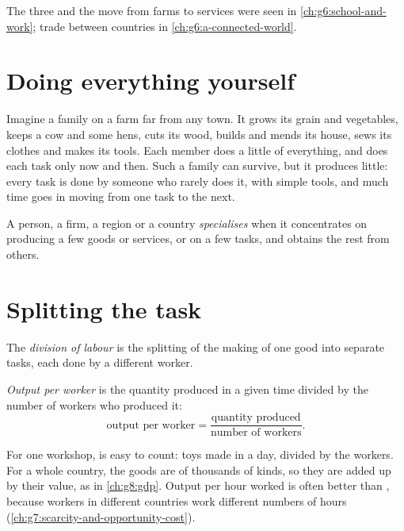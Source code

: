 \begin{recall}
The three  and the move from farms to services were seen in
\cref{ch:g6:school-and-work}; trade between countries in
\cref{ch:g6:a-connected-world}.
\end{recall}

\section{Doing everything yourself}

Imagine a family on a farm far from any town. It grows its grain and vegetables,
keeps a cow and some hens, cuts its wood, builds and mends its house, sews its
clothes and makes its tools. Each member does a little of everything, and does each
task only now and then. Such a family can survive, but it produces little: every
task is done by someone who rarely does it, with simple tools, and much time goes in
moving from one task to the next.

\begin{definition}[Specialisation]\label{def:g7:specialisation:specialisation}
A person, a firm, a region or a country \emph{specialises}
when it concentrates on producing a few goods or services, or on a few tasks, and
obtains the rest from others.
\end{definition}

\section{Splitting the task}

\begin{definition}\label{def:g7:specialisation:division-of-labour}
The \emph{division of labour} is the splitting of the
making of one good into separate tasks, each done by a different worker.
\end{definition}

\begin{definition}\label{def:g7:specialisation:output-per-worker}
\emph{Output per worker} is the quantity produced in a
given time divided by the number of workers who produced it:
\[
  \text{output per worker} = \frac{\text{quantity produced}}{\text{number of workers}}.
\]
\end{definition}

\begin{measure}
For one workshop,  is easy to count: toys made in a day, divided by
the workers. For a whole country, the goods are of thousands of kinds, so they are
added up by their value, as in \cref{ch:g8:gdp}. Output per hour worked is often
better than , because workers in different countries work different
numbers of hours (\cref{ch:g7:scarcity-and-opportunity-cost}).
\end{measure}

